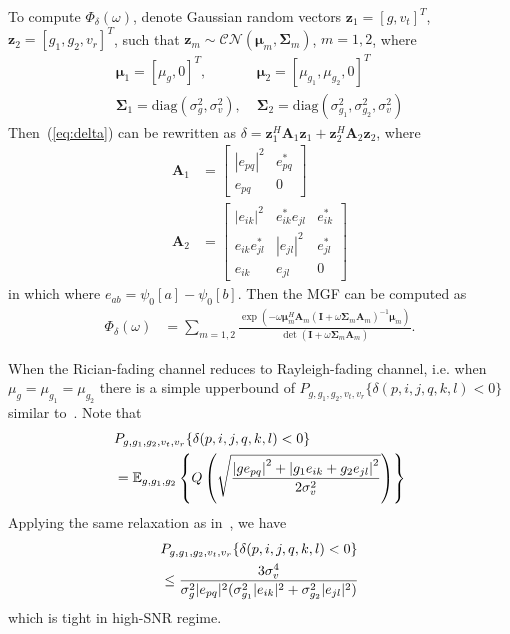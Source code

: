 \documentclass[conference]{IEEEtran}
\begin{document}
To compute $\Phi_{\delta}(\omega)$, denote Gaussian random vectors $\mathbf{z}_1
= [g, v_t]^T$, $\mathbf{z}_{2} = [g_1, g_2, v_r]^T$, such
that $\mathbf{z}_m\sim\mathcal{CN}(\bm{\mu}_m, \mathbf{\Sigma}_m)$,
$m=1,2$, where
\begin{align}
    \bm{\mu}_1 = [\mu_{g}, 0]^T,& \; \bm{\mu}_{2} = [\mu_{g_1}, \mu_{g_2},
    0]^T
    \\
    \mathbf{\Sigma}_1 = \mbox{diag}\left(\sigma_{g}^2, \sigma_v^2\right), & \;
    \mathbf{\Sigma}_2 = \mbox{diag}\left(\sigma_{g_1}^2, \sigma_{g_2}^2,
    \sigma_v^2\right)
\end{align}
Then~(\ref{eq:delta}) can be rewritten as $\delta =
\mathbf{z}_1^H\mathbf{A}_1\mathbf{z}_1 +
\mathbf{z}_{2}^H\mathbf{A}_{2}\mathbf{z}_{2}$, where
\begin{subequations}
    \begin{align}
        \mathbf{A}_1 & = \left[
            \begin{array}{cc}
                |e_{pq}|^2  & e_{pq}^* \\
                e_{pq} & 0
            \end{array}
        \right] \\
        \mathbf{A}_2 & = \left[
            \begin{array}{ccc}
            |e_{ik}|^2 & e_{ik}^*e_{jl} & e_{ik}^*
            \\
            e_{ik}e_{jl}^* & |e_{jl}|^2 & e_{jl}^*
            \\
            e_{ik} & e_{jl} & 0
        \end{array}
        \right]
    \end{align}
\end{subequations}
in which where $e_{ab} = \psi_0[a] - \psi_0[b]$. Then the MGF can be computed
as~\cite{schwartz1995communication}
\begin{align}
    \Phi_{\delta}(\omega) & = \sum_{m=1,2}
    \frac{\exp(-\omega\bm{\mu}_m^H\mathbf{A}_m(\mathbf{I} +
    \omega\mathbf{\Sigma}_m\mathbf{A}_m)^{-1}\bm{\mu}_m)}{\det(\mathbf{I} +
    \omega\mathbf{\Sigma}_m\mathbf{A}_m)}.
\end{align}


When the Rician-fading channel reduces to Rayleigh-fading channel, i.e.
when $\mu_{g}=\mu_{g_1} = \mu_{g_2}$ there is a simple upperbound
of $P_{g,g_1,g_2,v_t,v_r}\{\delta(p,i,j,q,k,l) < 0\}$ similar
to~\cite{seddik2008trans}. Note that
\begin{align}
    & P_{g,g_1,g_2,v_t,v_r}\{\delta(p,i,j,q,k,l) < 0\}  \notag \\
    & = \mathbb{E}_{g,g_1,g_2}
    \left\{Q\left(\sqrt{\frac{\left|ge_{pq}\right|^2
    + \left|g_1e_{ik} + g_2e_{jl}\right|^2}
    {2\sigma_v^2}}\right)\right\}
\end{align}
Applying the same relaxation as in~\cite{seddik2008trans}, we have
\begin{align}
    & P_{g,g_1,g_2,v_t,v_r}\{\delta(p,i,j,q,k,l) < 0\} \notag \\
    & \leq \frac{3\sigma_v^4}{\sigma_{g}^2|e_{pq}|^2 (\sigma_{g_1}^2|e_{ik}|^2
    +\sigma_{g_2}^2|e_{jl}|^2)}
    \label{eq:PEP_UB}
\end{align}
which is tight in high-SNR regime.
\end{document}
